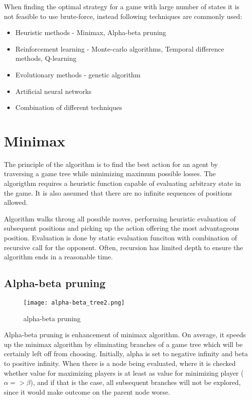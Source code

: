 When finding the optimal strategy for a game with large number
of states it is not feasible to use brute-force, instead following techniques
are commonly used:
\begin{itemize}
  \vspace*{-0.25cm}
  \setlength\itemsep{0cm}
  \item Heuristic methods - Minimax, Alpha-beta pruning
  \item Reinforcement learning - Monte-carlo algorithms,
                                      Temporal difference methods, Q-learning
  \item Evolutionary methods - genetic algorithm
  \item Artificial neural networks
  \item Combination of different techniques
  \vspace*{-0.15cm}
\end{itemize}

\section{Minimax}
The principle of the algorithm is to find the best action for an agent by
traversing a game tree while minimizing maximum possible losses.
The algorigthm requires a heuristic function capable of evaluating arbitrary
state in the game. It is also assumed that there are no infinite sequences
of positions allowed.

Algorithm walks throug all possible moves, performing heuristic evaluation
of subsequent positions and picking up the action offering the most
advantageous position. Evaluation is done by static evaluation funciton with
combination of recursive call for the opponent. Often, recursion has
limited depth to ensure the algorithm ends in a reasonable time.

\subsection{Alpha-beta pruning}
\begin{wrapfigure}{r}{0.5\textwidth}
  \vspace*{-2.85cm}
  \centering
  \texttt{[image: alpha-beta\_tree2.png]}
  \vspace*{-0.85cm}
  \caption{alpha-beta pruning}
  \label{fig:abp}
  \vspace*{-0.60cm}
\end{wrapfigure}

Alpha-beta pruning is enhancement of minimax algorithm. On average, it
speeds up the minimax algorithm by eliminating branches of a game tree which
will be certainly left off from choosing. Initially, alpha is set to negative
infinity and beta to positive infinity. When there is a node being evaluated,
where it is checked whether value for maximizing players is at least as value
for minimizing player ($\alpha{=>}\beta$), and if that is the case,
all subsequent branches will not be explored, since it would make outcome
on the parent node worse.

